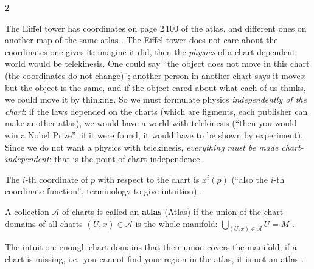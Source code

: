 \begin{paracol}{2}
\begin{intuition}
The Eiffel tower has coordinates on page 2\,100 of the atlas, and different ones on another map of the same atlas
. The Eiffel tower does not care about the coordinates one gives it:
imagine it did, then the \emph{physics} of a chart-dependent world would be telekinesis. One could say ``the object does
not move in this chart (the coordinates do not change)''; another person in another chart says it moves; but the object is
the same, and if the object cared about what each of us thinks, we could move it by thinking. So we must formulate
physics \emph{independently of the chart}: if the laws depended on the charts (which are figments, each publisher can make
another atlas), we would have a world with telekinesis (``then you would win a Nobel Prize'': if it were
found, it would have to be shown by experiment). Since we do not want a physics with telekinesis, \emph{everything must be
made chart-independent}: that is the point of chart-independence .
\end{intuition}
The $i$-th coordinate of $p$ with respect to the chart is $x^i(p)$ (``also the $i$-th coordinate function'', terminology
to give intuition) .

\begin{definition}\label{def:tm-atlas}
A collection $\mathcal A$ of charts is called an \textbf{atlas} (Atlas) if the union of the chart domains of all charts
$(U,x)\in\mathcal A$ is the whole manifold: $\bigcup_{(U,x)\in\mathcal A}U=M$ .
\end{definition}
The intuition: enough chart domains that their union covers the manifold; if a chart is missing, i.e.\ you cannot find
your region in the atlas, it is not an atlas .


\end{paracol}
